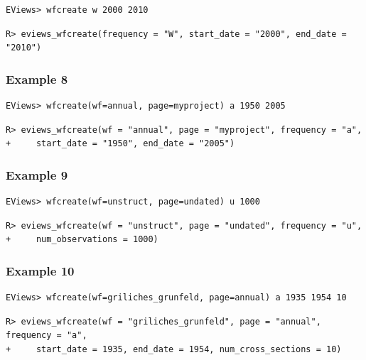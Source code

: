 \begin{verbatim}
EViews> wfcreate w 2000 2010
\end{verbatim}

\begin{verbatim}
R> eviews_wfcreate(frequency = "W", start_date = "2000", end_date = "2010")
\end{verbatim}

\hypertarget{example-8-2}{%
\subsubsection{Example 8}\label{example-8-2}}

\begin{verbatim}
EViews> wfcreate(wf=annual, page=myproject) a 1950 2005
\end{verbatim}

\begin{verbatim}
R> eviews_wfcreate(wf = "annual", page = "myproject", frequency = "a",
+     start_date = "1950", end_date = "2005")
\end{verbatim}

\hypertarget{example-9-1}{%
\subsubsection{Example 9}\label{example-9-1}}

\begin{verbatim}
EViews> wfcreate(wf=unstruct, page=undated) u 1000
\end{verbatim}

\begin{verbatim}
R> eviews_wfcreate(wf = "unstruct", page = "undated", frequency = "u",
+     num_observations = 1000)
\end{verbatim}

\hypertarget{example-10-1}{%
\subsubsection{Example 10}\label{example-10-1}}

\begin{verbatim}
EViews> wfcreate(wf=griliches_grunfeld, page=annual) a 1935 1954 10
\end{verbatim}

\begin{verbatim}
R> eviews_wfcreate(wf = "griliches_grunfeld", page = "annual", frequency = "a",
+     start_date = 1935, end_date = 1954, num_cross_sections = 10)
\end{verbatim}

